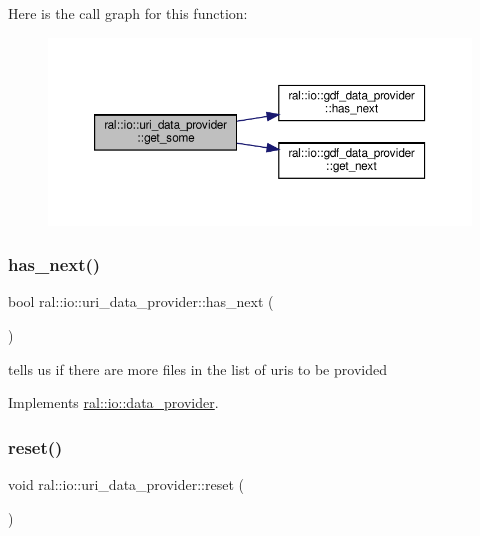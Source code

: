 Here is the call graph for this function\+:\nopagebreak
\begin{figure}[H]
\begin{center}
\leavevmode
\includegraphics[width=350pt]{classral_1_1io_1_1uri__data__provider_a53be24f2a445940e82c15b324c7b7c5f_cgraph}
\end{center}
\end{figure}
\mbox{\label{classral_1_1io_1_1uri__data__provider_a1815b5e9fa0b323b0cf9c0ff932a1c4b}} 
\subsubsection{\texorpdfstring{has\+\_\+next()}{has\_next()}}
{\footnotesize\ttfamily bool ral\+::io\+::uri\+\_\+data\+\_\+provider\+::has\+\_\+next (\begin{DoxyParamCaption}{ }\end{DoxyParamCaption})\hspace{0.3cm}{\ttfamily [virtual]}}

tells us if there are more files in the list of uris to be provided 

Implements \hyperlink{classral_1_1io_1_1data__provider_a92176228bbef65093853e2e2165a6d71}{ral\+::io\+::data\+\_\+provider}.

\mbox{\label{classral_1_1io_1_1uri__data__provider_aaab8f4f12a00b546a4cc01260d9199c8}} 
\subsubsection{\texorpdfstring{reset()}{reset()}}
{\footnotesize\ttfamily void ral\+::io\+::uri\+\_\+data\+\_\+provider\+::reset (\begin{DoxyParamCaption}{ }\end{DoxyParamCaption})\hspace{0.3cm}{\ttfamily [virtual]}}

